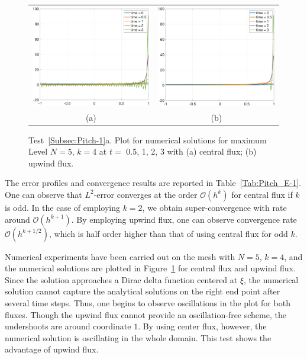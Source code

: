 \documentclass[preprint,11pt]{elsarticle}
\begin{document}
\begin{figure}[H]
\begin{tabular}{cc}
  \includegraphics[width=.45\textwidth,height=.3\textwidth]{./NumFig/Test1-CF-L5D5}
  &\includegraphics[width=.45\textwidth,height=.3\textwidth]{./NumFig/Test1-UF-L5D5}\\
  (a) & (b)
  \end{tabular}
  \caption{Test~\ref{Subsec:Pitch-1}a. Plot for numerical solutions for maximum Level $N=5$, $k = 4$ at $t = $ 0.5, 1, 2, 3 with (a) central flux; (b) upwind flux.}\label{Fig:Pitch_E_1-Num2}
\end{figure}

The error profiles and convergence results are reported in Table~\ref{Tab:Pitch_E-1}. One can observe that $L^2$-error converges at the order $\mathcal{O}(h^k)$ for central flux if $k$ is odd. In the case of employing $k=2$, we obtain super-convergence with rate around $\mathcal{O}(h^{k+1})$. By employing upwind flux, one can observe convergence rate $\mathcal{O}(h^{k+1/2})$, which is half order higher than that of using central flux for odd $k$. 

Numerical experiments have been carried out on the mesh with $N = 5$, $k = 4$, and the numerical solutions are plotted in Figure~\ref{Fig:Pitch_E_1-Num2} for central flux and upwind flux. Since the solution approaches a Dirac delta function centered at $\xi$, the numerical solution cannot capture the analytical solutions on the right end point after several time steps. Thus, one begins to observe oscillations in the plot for both fluxes. Though the upwind flux cannot provide an oscillation-free scheme, the undershoots are around coordinate $1$. By using center flux, however, the numerical solution is oscillating in the whole domain. This test shows the advantage of upwind flux.
\end{document}
